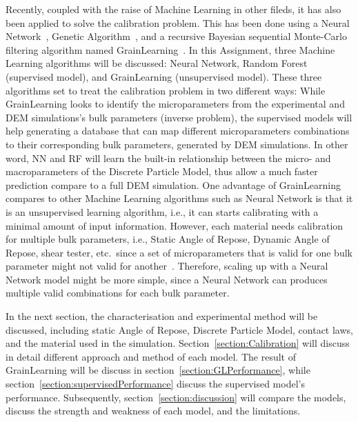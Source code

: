 Recently, coupled with the raise of Machine Learning in other fileds, it has also been applied to solve the calibration problem. This has been done using a Neural Network~\cite{nn-calibration, NN-GA, NN-coarse, YE2019292}, Genetic Algorithm~\cite{ga-calibration}, and a recursive Bayesian sequential Monte-Carlo filtering algorithm named GrainLearning~\cite{grainLearning}. In this Assignment, three Machine Learning algorithms will be discussed: Neural Network, Random Forest (supervised model), and GrainLearning (unsupervised model). These three algorithms set to treat the calibration problem in two different ways: While GrainLearning looks to identify the microparameters from the experimental and DEM simulations's bulk parameters (inverse problem), the supervised models will help generating a database that can map different microparameters combinations to their corresponding bulk parameters, generated by DEM simulations. In other word, NN and RF will learn the built-in relationship between the micro- and macroparameters of the Discrete Particle Model, thus allow a much faster prediction compare to a full DEM simulation. One advantage of GrainLearning compares to other Machine Learning algorithms such as Neural Network is that it is an unsupervised learning algorithm, i.e., it can starts calibrating with a minimal amount of input information. However, each material needs calibration for multiple bulk parameters, i.e., Static Angle of Repose, Dynamic Angle of Repose, shear tester, etc.~since a set of microparameters that is valid for one bulk parameter might not valid for another~\cite{reviewCalibration}. Therefore, scaling up with a Neural Network model might be more simple, since a Neural Network can produces multiple valid combinations for each bulk parameter.  

In the next section, the characterisation and experimental method will be discussed, including static Angle of Repose, Discrete Particle Model, contact laws, and the material used in the simulation. Section~\ref{section:Calibration} will discuss in detail different approach and method of each model. The result of GrainLearning will be discuss in section~\ref{section:GLPerformance}, while section~\ref{section:supervisedPerformance} discuss the supervised model's performance. Subsequently, section~\ref{section:discussion} will compare the models, discuss the strength and weakness of each model, and the limitations.

